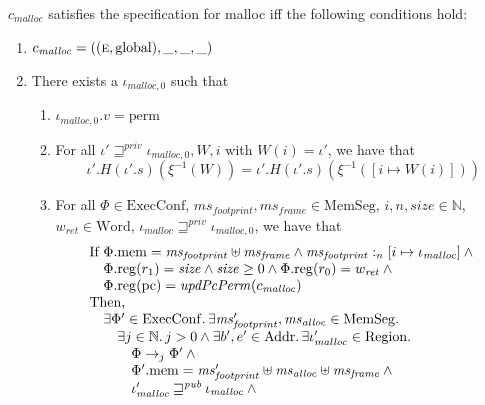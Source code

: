 \documentclass[format=acmsmall, review=true, screen=true]{acmart}
\newcommand{\var}[1]{\mathit{#1}}
\newcommand{\hs}{\var{ms}}
\newcommand{\ms}{\hs}
\newcommand{\pcreg}{\mathrm{pc}}
\newcommand{\heap}{\var{mem}}
\newcommand{\hsframe}{\hs_\var{frame}}
\newcommand{\size}{\var{size}}
\newcommand{\plainproj}[1]{\mathrm{#1}}
\newcommand{\memheap}[1][\Phi]{#1.\plainproj{mem}}
\newcommand{\memreg}[1][\Phi]{#1.\plainproj{reg}}
\newcommand{\plainfun}[2]{
  \ifthenelse{\equal{#2}{}}
  {\mathit{#1}}
  {\mathit{#1}(#2)}
}
\newcommand{\updatePcPerm}[1]{\plainfun{updPcPerm}{#1}}
\newcommand{\futurewk}{\mathbin{\sqsupseteq}^{\var{pub}}}
\newcommand{\futurestr}{\mathbin{\sqsupseteq}^{\var{priv}}}
\newcommand{\heapSat}[3][\heap]{#1 :_{#2} #3}
\newcommand{\codelabel}[1]{\mathit{#1}}
\newcommand{\malloc}{\codelabel{malloc}}
\newcommand{\plaindom}[1]{\mathrm{#1}}
\newcommand{\Words}{\plaindom{Word}}
\newcommand{\Addrs}{\plaindom{Addr}}
\newcommand{\ExecConfs}{\plaindom{ExecConf}}
\newcommand{\HeapSegments}{\plaindom{MemSeg}}
\newcommand{\nats}{\mathbb{N}}
\newcommand{\Regions}{\plaindom{Region}}
\newcommand{\plainperm}[1]{\textsc{#1}}
\newcommand{\entry}{\plainperm{e}}
\newcommand{\plainlocality}[1]{\mathrm{#1}}
\newcommand{\glob}{\plainlocality{global}}
\newcommand{\plainview}[1]{\mathrm{#1}}
\newcommand{\perma}{\plainview{perm}}
\newcommand{\step}[1][]{\rightarrow_{#1}}
\newenvironment{toplas}{}{}
\begin{document}
\begin{toplas}
\begin{definition}
  \label{spec:malloc}
  $c_\malloc$ satisfies the specification for malloc iff the following
  conditions hold:
  \begin{enumerate}
  \item \label{item:malloc-spec:eg} $c_\malloc = ((\entry,\glob),\_,\_,\_)$
  \item \label{item:malloc-spec:reg} There exists a $\iota_{\malloc,0}$ such that
    \begin{enumerate}
    \item \label{item:malloc-spec:perm} $\iota_{\malloc,0}.v = \perma$
    \item \label{item:malloc-spec:independent} For all $\iota' \futurestr \iota_{\malloc,0}, W,i$ with
      $W(i)=\iota'$, we have that
      \begin{equation*}
        \iota'.H (\iota'.s) (\xi^{-1}(W)) = \iota'.H (\iota'.s) (\xi^{-1}([i \mapsto W(i)]))
      \end{equation*}
    \item \label{item:malloc-spec:correct-exec} For all $\Phi \in \ExecConfs$, $\ms_{\var{footprint}}, \hsframe \in
      \HeapSegments$, $i, n, \size \in \nats$, $w_{\var{ret}} \in \Words$,
      $\iota_\malloc \futurestr \iota_{\malloc,0}$, we have that
      \[
        \begin{array}{l}
          \text{If }
          \memheap = \ms_{\var{footprint}} \uplus \hsframe \land \heapSat[\ms_{\var{footprint}}]{n}{[i \mapsto \iota_\malloc]} \land{} \\
          \quad\memreg(r_1) = \size \land \size \geq 0 \land  \memreg(r_0) = w_{\var{ret}} \land{} \\
          \quad \memreg(\pcreg) = \updatePcPerm{c_\malloc} \\ %
          \text{Then, } \\
          \quad \exists \Phi' \in \ExecConfs \ldotp \exists \ms_{\var{footprint}}', \ms_{\var{alloc}} \in \HeapSegments\ldotp\\
          \qquad \exists j \in \nats \ldotp j > 0 \land \exists b',e'\in \Addrs \ldotp \exists \iota_\malloc' \in \Regions \ldotp \\
          \qquad \quad \Phi \step[j] \Phi' \land{} \\
          \qquad \quad \memheap[\Phi']=\ms_{\var{footprint}}' \uplus \hs_{\var{alloc}} \uplus \hsframe \land{}\\
          \qquad \quad \iota_{\malloc}' \futurewk \iota_\malloc \land{} \\

\end{array}\]
\end{enumerate}
\end{enumerate}
\end{definition}
\end{toplas}
\end{document}
